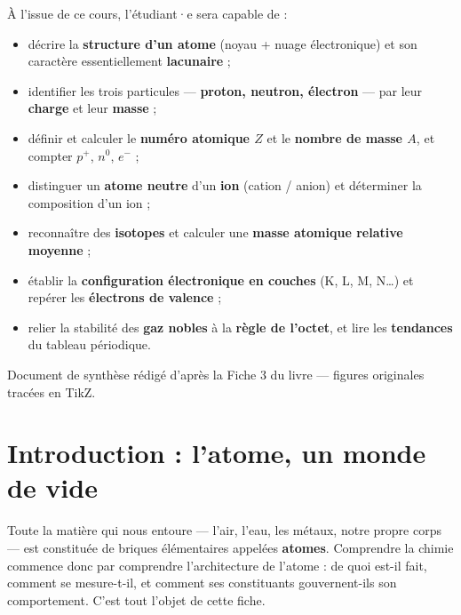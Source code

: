 \documentclass[11pt,a4paper]{article}
\newcommand{\pp}{p^{+}}      %
\newcommand{\ee}{e^{-}}      %
\newcommand{\nz}{n^{0}}      %
\begin{document}
\begin{tcolorbox}[boxbase,colback=primary!5,colframe=primary,width=15cm,
    title={\textsc{Objectifs pédagogiques de la fiche}}]
À l'issue de ce cours, l'étudiant·e sera capable de :
\begin{itemize}[leftmargin=1.6em,topsep=2pt,itemsep=1pt]
  \item décrire la \textbf{structure d'un atome} (noyau + nuage électronique) et son caractère essentiellement \textbf{lacunaire} ;
  \item identifier les trois particules — \textbf{proton, neutron, électron} — par leur \textbf{charge} et leur \textbf{masse} ;
  \item définir et calculer le \textbf{numéro atomique $Z$} et le \textbf{nombre de masse $A$}, et compter $\pp$, $\nz$, $\ee$ ;
  \item distinguer un \textbf{atome neutre} d'un \textbf{ion} (cation / anion) et déterminer la composition d'un ion ;
  \item reconnaître des \textbf{isotopes} et calculer une \textbf{masse atomique relative moyenne} ;
  \item établir la \textbf{configuration électronique en couches} (K, L, M, N\dots) et repérer les \textbf{électrons de valence} ;
  \item relier la stabilité des \textbf{gaz nobles} à la \textbf{règle de l'octet}, et lire les \textbf{tendances} du tableau périodique.
\end{itemize}
\end{tcolorbox}

\vspace{0.4cm}
{\small\color{black!60} Document de synthèse rédigé d'après la Fiche 3 du livre — figures originales tracées en TikZ.}
\par
\endgroup

\newpage
\renewcommand{\contentsname}{\textcolor{primarydark}{Table des matières}}
\tableofcontents
\thispagestyle{fancy}
\newpage

\section{Introduction : l'atome, un monde de vide}
Toute la matière qui nous entoure — l'air, l'eau, les métaux, notre propre corps — est constituée
de briques élémentaires appelées \textbf{atomes}. Comprendre la chimie commence donc par comprendre
l'architecture de l'atome : de quoi est-il fait, comment se mesure-t-il, et comment ses constituants
gouvernent-ils son comportement. C'est tout l'objet de cette fiche.
\end{document}
